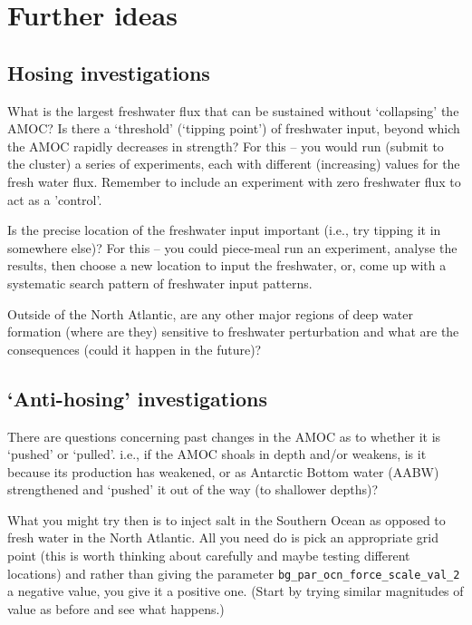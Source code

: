 \documentclass[11pt,fleqn]{book} %
\begin{document}
\newpage


\section{Further ideas}


\subsection{Hosing investigations}

What is the largest freshwater flux that can be sustained without ‘collapsing’ the AMOC? Is there a ‘threshold’ (‘tipping point’) of freshwater input, beyond which the AMOC rapidly decreases in strength? For this -- you would run (submit to the cluster) a series of experiments, each with different (increasing) values for the fresh water flux. Remember to include an experiment with zero freshwater flux to act as a 'control'.

Is the precise location of the freshwater input important (i.e., try tipping it in somewhere else)? For this -- you could piece-meal run an experiment, analyse the results, then choose a new location to input the freshwater, or, come up with a systematic search pattern of freshwater input patterns.  

Outside of the North Atlantic, are any other major regions of deep water formation (where are they) sensitive to freshwater perturbation and what are the consequences (could it happen in the future)?


\subsection{‘Anti-hosing’ investigations}

There are questions concerning past changes in the AMOC as to whether it is ‘pushed’ or ‘pulled’. i.e., if the AMOC shoals in depth and/or weakens, is it because its production has weakened, or as Antarctic Bottom water (AABW) strengthened and ‘pushed’ it out of the way (to shallower depths)?

What you might try then is to inject salt in the Southern Ocean as opposed to fresh water in the North Atlantic. All you need do is pick an appropriate grid point (this is worth thinking about carefully and maybe testing different locations) and rather than giving the parameter \texttt{bg\_par\_ocn\_force\_scale\_val\_2} a negative value, you give it a positive one. (Start by trying similar magnitudes of value as before and see what happens.)
\end{document}
